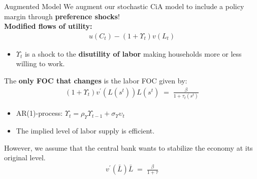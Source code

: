 \documentclass[10pt,c,aspectratio=1610,handout]{beamer}
\begin{document}
\begin{frame}{Augmented Model}%
  We augment our stochastic CiA model to include a policy margin through \textbf{preference shocks}!\vspace{0.1in}\\%
  \pause%
  \textbf{Modified flows of utility:}%
  \begin{align}%
    u(C_t) - \left( 1 + \Upsilon_t \right) v(L_t)%
  \end{align}%
  \vspace{-0.2in}%
  \begin{itemize}%
    \small%
    \item[$\blacktriangleright$] $\Upsilon_t$ is a shock to the \textbf{disutility of labor} making households more or less willing to work.%
  \end{itemize}%
  \pause%
  The \textbf{only FOC that changes} is the labor FOC given by:%
  \begin{align}%
    \left(1+\Upsilon_t\right) v^{\prime}(L(s^t)) L(s^t) \; = \; \frac{\beta}{1+\tau_t(s^t)}%
  \end{align}%
  \vspace{-0.2in}%
  \begin{itemize}%
    \small%
    \item[$\blacktriangleright$] AR(1)-process: $\Upsilon_t = \rho_\Upsilon \Upsilon_{t-1} + \sigma_\Upsilon \upsilon_t$%
    \item[$\blacktriangleright$] The implied level of labor supply is efficient.%
  \end{itemize}%
  \pause%
  \vspace{0.1in}%
  However, we assume that the central bank wants to stabilize the economy at its original level.%
  \begin{align}%
    v^{\prime} (\bar{L}) \bar{L} \; = \; \frac{\beta}{1+\bar{\tau}}%
  \end{align}%
  \vspace{-0.2in}%
\end{frame}%
\end{document}

